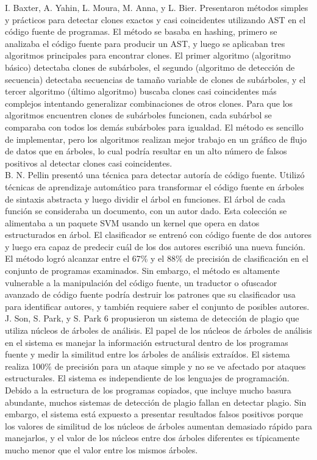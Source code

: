 I. Baxter, A. Yahin, L. Moura, M. Anna, y L. Bier. Presentaron métodos simples y prácticos para detectar clones exactos y casi coincidentes utilizando AST en el código fuente de programas. El método se basaba en hashing, primero se analizaba el código fuente para producir un AST, y luego se aplicaban tres algoritmos principales para encontrar clones. El primer algoritmo (algoritmo básico) detectaba clones de subárboles, el segundo (algoritmo de detección de secuencia) detectaba secuencias de tamaño variable de clones de subárboles, y el tercer algoritmo (último algoritmo) buscaba clones casi coincidentes más complejos intentando generalizar combinaciones de otros clones. Para que los algoritmos encuentren clones de subárboles funcionen, cada subárbol se comparaba con todos los demás subárboles para igualdad. El método es sencillo de implementar, pero los algoritmos realizan mejor trabajo en un gráfico de flujo de datos que en árboles, lo cual podría resultar en un alto número de falsos positivos al detectar clones casi coincidentes.\\

 B. N. Pellin presentó una técnica para detectar autoría de código fuente. Utilizó técnicas de aprendizaje automático para transformar el código fuente en árboles de sintaxis abstracta y luego dividir el árbol en funciones. El árbol de cada función se consideraba un documento, con un autor dado. Esta colección se alimentaba a un paquete SVM usando un kernel que opera en datos estructurados en árbol. El clasificador se entrenó con código fuente de dos autores y luego era capaz de predecir cuál de los dos autores escribió una nueva función. El método logró alcanzar entre el 67\% y el 88\% de precisión de clasificación en el conjunto de programas examinados. Sin embargo, el método es altamente vulnerable a la manipulación del código fuente, un traductor o ofuscador avanzado de código fuente podría destruir los patrones que su clasificador usa para identificar autores, y también requiere saber el conjunto de posibles autores.\\
 
 J. Son, S. Park, y S. Park 6 propusieron un sistema de detección de plagio que utiliza núcleos de árboles de análisis. El papel de los núcleos de árboles de análisis en el sistema es manejar la información estructural dentro de los programas fuente y medir la similitud entre los árboles de análisis extraídos. El sistema realiza 100\% de precisión para un ataque simple y no se ve afectado por ataques estructurales. El sistema es independiente de los lenguajes de programación. Debido a la estructura de los programas copiados, que incluye mucho basura abundante, muchos sistemas de detección de plagio fallan en detectar plagio. Sin embargo, el sistema está expuesto a presentar resultados falsos positivos porque los valores de similitud de los núcleos de árboles aumentan demasiado rápido para manejarlos, y el valor de los núcleos entre dos árboles diferentes es típicamente mucho menor que el valor entre los mismos árboles. \cite{smith2020enhanced}

